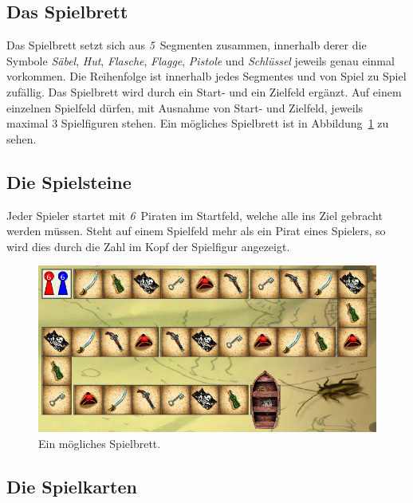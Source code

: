 \documentclass[a4paper, ngerman]{scrartcl}
\newcommand{\SpielSegmenteAnzahl}{\emph{5}}
\newcommand{\PiratenAnzahl}{\emph{6}}
\begin{document}
	\subsection{Das Spielbrett}
Das Spielbrett setzt sich aus \SpielSegmenteAnzahl\ Segmenten zusammen,
innerhalb derer die Symbole \emph{Säbel},  \emph{Hut}, \emph{Flasche},
\emph{Flagge}, \emph{Pistole} und \emph{Schlüssel} jeweils genau einmal
vorkommen.
Die Reihenfolge ist innerhalb jedes Segmentes und von Spiel zu Spiel zufällig.
Das Spielbrett wird durch ein Start- und ein Zielfeld ergänzt.
Auf einem einzelnen Spielfeld dürfen, mit Ausnahme von Start- und Zielfeld,
jeweils maximal 3 Spielfiguren stehen. Ein mögliches Spielbrett ist in
Abbildung~\ref{fig:Spielfeld} zu sehen.


\subsection{Die Spielsteine}
Jeder Spieler startet mit \PiratenAnzahl\ Piraten im Startfeld, welche alle ins
Ziel gebracht werden müssen. Steht auf einem Spielfeld mehr als ein Pirat eines
Spielers, so wird dies durch die Zahl im Kopf der Spielfigur angezeigt.


\begin{figure}[h] \centering \includegraphics[scale = 0.5]{bilder/Spielfeld}
	\caption{Ein mögliches Spielbrett.}
	\label{fig:Spielfeld}
	\end{figure}
	
	\subsection{Die Spielkarten}
	
\end{document}
